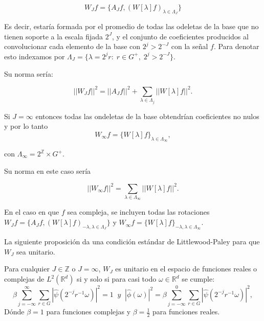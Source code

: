$$W_J f=\lbrace A_Jf,(W[\lambda]f)_{\lambda \in \Lambda_J} \rbrace$$ 

\noindent Es decir, estaría formada por el promedio de todas las odeletas de la base que no tienen soporte a la escala fijada $2^J$, y el conjunto de coeficientes producidos al convolucionar cada elemento de la base con $2^j>2^{-J}$ con la señal $f$. Para denotar esto indexamos por $\Lambda_J=\lbrace \lambda=2^jr:\;r\in G^{+}, \; 2^j>2^{-J}\rbrace$. 

\medskip

\noindent Su norma sería: 

\begin{equation} \label{eq::norma}
  ||W_Jf||^2=||A_Jf||^2+\sum_{\lambda \in \Lambda_j} ||W[\lambda]f||^2.
\end{equation}

\medskip
 
\noindent Si $J=\infty$ entonces todas las ondeletas de la base obtendrían coeficientes no nulos y por lo tanto 
$$W_\infty f=\lbrace W[\lambda]f\rbrace_{\lambda \in \Lambda_\infty},$$ 

\noindent con $\Lambda_\infty=2^\mathbb{Z} \times G^{+}$. 

\noindent Su norma en este caso sería 

$$||W_\infty f||^2=\sum_{\lambda \in \Lambda_\infty} ||W[\lambda]f||^2.$$

\noindent En el caso en que $f$ sea compleja, se incluyen todas las rotaciones $W_Jf=\lbrace A_J f,(W[\lambda]f)_{-\lambda,\lambda \in \Lambda_J} \rbrace$ y $W_\infty f=\lbrace W[\lambda]f\rbrace_{-\lambda,\lambda \in \Lambda_\infty}$. 

\medskip

\noindent La siguiente proposición da una condición estándar de Littlewood-Paley para que $W_J$ sea unitario.

\begin{proposicion} \label{unitario}
 Para cualquier $J \in \mathbb{Z}$ o $J=\infty$, $W_J$ es unitario en el espacio de funciones reales o complejas de $L^2(\mathbb{R}^d)$ si y solo si para casi todo $\omega \in \mathbb{R}^d$ se cumple: 
    \begin{equation}\label{eq::1.2}
        \beta \sum_{j=-\infty}^\infty \sum_{r \in G} |\widehat{\psi}(2^{-j}r^{-1}\omega)|^2=1 \; \; y
        \;\;|\widehat{\phi}(\omega)|^2= \beta \sum_{j=-\infty}^0 \sum_{r\in G} |\widehat{\psi}(2^{-j}r^{-1}\omega)|^2,
    \end{equation}
 Dónde $\beta=1$ para funciones complejas y $\beta=\frac{1}{2}$ para funciones reales.
\end{proposicion}

